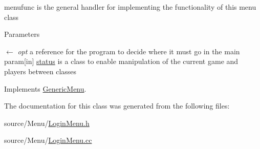 menufunc is the general handler for implementing the functionality of this menu class 
\begin{DoxyParams}{Parameters}
\item[\mbox{$\leftarrow$} {\em opt}]a reference for the program to decide where it must go in the main param\mbox{[}in\mbox{]} \hyperlink{classstatus}{status} is a class to enable manipulation of the current game and players between classes \end{DoxyParams}


Implements \hyperlink{classGenericMenu_a290ad7ec3331edc968190b1d7b48a397}{GenericMenu}.

The documentation for this class was generated from the following files:\begin{DoxyCompactItemize}
\item 
source/Menu/\hyperlink{LoginMenu_8h}{LoginMenu.h}\item 
source/Menu/\hyperlink{LoginMenu_8cc}{LoginMenu.cc}\end{DoxyCompactItemize}
